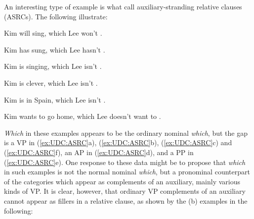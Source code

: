 \documentclass[output=paper
	        ,collection
	        ,collectionchapter
 	        ,biblatex
                ,babelshorthands
                ,newtxmath
                ,draftmode
                ,colorlinks, citecolor=brown
]{langscibook}
\begin{document}
{An interesting type of example is what \citet{Arnold:Borsley:10} call
auxiliary-stranding relative clauses (ASRCs). The following
illustrate:

\begin{exe}
  \ex \label{ex:UDC:ASRC}
  \begin{xlist}
    \ex Kim will sing, which Lee won't \trace{}.
    
    \ex Kim has sung, which Lee hasn't \trace{}.
    
    \ex Kim is singing, which Lee isn't \trace{}.
    
    \ex Kim is clever, which Lee isn't \trace{}.
    
    \ex Kim is in Spain, which Lee isn't \trace{}.
    
    \ex Kim wants to go home, which Lee doesn't want to \trace{}.
  \end{xlist}
\end{exe}

\noindent
\emph{Which} in these examples appears to be the ordinary nominal
\emph{which}, but the gap is a VP in (\ref{ex:UDC:ASRC}a), (\ref{ex:UDC:ASRC}b), (\ref{ex:UDC:ASRC}c) and (\ref{ex:UDC:ASRC}f), an AP in
(\ref{ex:UDC:ASRC}d), and a PP in (\ref{ex:UDC:ASRC}e). One response to these data might be to propose
that \emph{which} in such examples is not the normal nominal
\emph{which}, but a pronominal counterpart of the categories which appear
as complements of an auxiliary, mainly various kinds of VP. It is clear,
however, that ordinary VP complements of an auxiliary cannot appear as
fillers in a relative clause, as shown by the (b) examples in the
following:

\begin{exe} \ex \begin{xlist} 

\end{xlist}
\end{exe}

\begin{exe} \ex \begin{xlist} 

\end{xlist}
\end{exe}
\noindent
\begin{exe} \ex \begin{xlist} 


\end{xlist}
\end{exe}}
\end{document}

